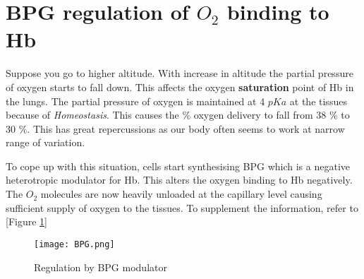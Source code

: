 \documentclass[12pt]{article}
\begin{document}
 \section{BPG regulation of $O_{2}$ binding to Hb}
Suppose you go to higher altitude. With increase in altitude the partial pressure of oxygen starts to fall down. This affects the oxygen \textbf{saturation} point of Hb in the lungs. The partial pressure of oxygen is maintained at 4 $ pKa$ at the tissues because of \textit{Homeostasis}. This causes the $\%$ oxygen delivery to fall from 38 $\%$ to 30 $\%$. This has great repercussions as our body often seems to work at narrow range of variation.

To cope up with this situation, cells start synthesising BPG which is a negative heterotropic modulator for Hb. This alters the oxygen binding to Hb negatively. The $O_{2}$ molecules are now heavily unloaded at the capillary level causing sufficient supply of oxygen to the tissues. 
To supplement the information, refer to [Figure \ref{fig BPG}]
\begin{figure}[h]
\centering
\texttt{[image: BPG.png]}
\caption{Regulation by BPG modulator}
\label{fig BPG}
\end{figure}
\end{document}
